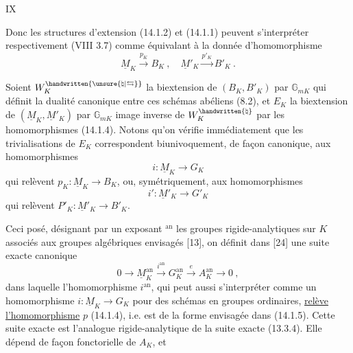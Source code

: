 \hfill IX

Donc les structures d'extension (14.1.2) et (14.1.1) peuvent s'interpréter respectivement (VIII 3.7) comme équivalant à la donnée d'homomorphisme
\[
\underline M_K\xrightarrow{p_K} B_K\ ,\quad \underline M'_K\xrightarrow{p'_K} B'_K\ .\tag*{(14.1.4)}
\]

Soient $W_K^{\handwritten{\unsure{\natural|\leftrightarrows}}}$ la biextension de $(B_K,B'_K)$ par $\mathbb G_{mK}$ qui définit la dualité canonique entre ces schémas abéliens (8.2), et $E_K$ la biextension de $(\underline M_K,\underline M'_K)$ par $\mathbb G_{mK}$ image inverse de $W_K^{\handwritten{\natural}}$ par les homomorphismes (14.1.4). Notons qu'on vérifie immédiatement que les trivialisations de $E_K$ correspondent biunivoquement, de façon canonique, aux homomorphismes
\[
i:\underline M_K\longrightarrow G_K\tag*{(14.1.5)}
\]
qui relèvent $p_K:\underline M_K\longrightarrow B_K$, ou, symétriquement, aux homomorphismes
\[
i':\underline M'_K\longrightarrow G'_K\tag*{(14.1.6)}
\]
qui relèvent $P'_K:\underline M'_K\longrightarrow B'_K$.

Ceci posé, désignant par un exposant $^{\mathrm{an}}$ les groupes rigide-analytiques sur $K$ associés aux groupes algébriques envisagés [13], on définit dans [24] une suite exacte canonique
\[
0\longrightarrow \underline M_K^{\mathrm{an}}\xrightarrow{i^{\mathrm{an}}}G_K^{\mathrm{an}}\xrightarrow{e} A_K^{\mathrm{an}}\longrightarrow 0\ ,\tag*{(14.1.7)}
\]
dans laquelle l'homomorphisme $i^{\mathrm{an}}$, qui peut aussi s'interpréter comme un homomorphisme $i:\underline M_K\longrightarrow G_K$ pour des schémas en groupes ordinaires, \uline{relève l'homomorphisme} $p$ (14.1.4), i.e. est de la forme envisagée dans (14.1.5). Cette suite exacte est l'analogue rigide-analytique de la suite exacte (13.3.4). Elle dépend de façon fonctorielle de $A_K$, et



